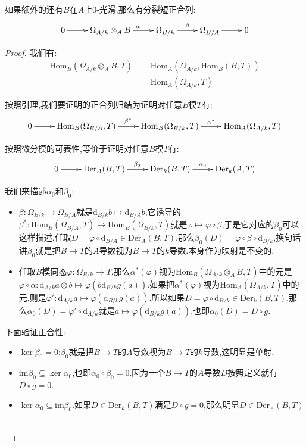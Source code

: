 \begin{enumerate}
	如果额外的还有$B$在$A$上0-光滑,那么有分裂短正合列:
	$$\xymatrix{0\ar[r]&\Omega_{A/k}\otimes_AB\ar[r]^{\alpha}&\Omega_{B/k}\ar[r]^{\beta}&\Omega_{B/A}\ar[r]&0}$$
	\begin{proof}
		
		我们有:
		\begin{align*}
			\mathrm{Hom}_B(\Omega_{A/k}\otimes_AB,T)&=\mathrm{Hom}_A(\Omega_{A/k},\mathrm{Hom}_B(B,T))\\&=\mathrm{Hom}_A(\Omega_{A/k},T)
		\end{align*}
		
		按照引理,我们要证明的正合列归结为证明对任意$B$模$T$有:
		$$\xymatrix{0\ar[r]&\mathrm{Hom}_B(\Omega_{B/A},T)\ar[r]^{\beta^*}&\mathrm{Hom}_B(\Omega_{B/k},T)\ar[r]^{\alpha^*}&\mathrm{Hom}_A(\Omega_{A/k},T)}$$
		
		按照微分模的可表性,等价于证明对任意$B$模$T$有:
		$$\xymatrix{0\ar[r]&\mathrm{Der}_A(B,T)\ar[r]^{\beta_0}&\mathrm{Der}_k(B,T)\ar[r]^{\alpha_0}&\mathrm{Der}_k(A,T)}$$
		
		我们来描述$\alpha_0$和$\beta_0$:
		\begin{itemize}
			\item $\beta:\Omega_{B/k}\to\Omega_{B/A}$就是$\mathrm{d}_{B/k}b\mapsto\mathrm{d}_{B/A}b$,它诱导的$\beta^*:\mathrm{Hom}_B(\Omega_{B/A},T)\to\mathrm{Hom}_B(\Omega_{B/k},T)$就是$\varphi\mapsto\varphi\circ\beta$,于是它对应的$\beta_0$可以这样描述,任取$D=\varphi\circ\mathrm{d}_{B/A}\in\mathrm{Der}_A(B,T)$,那么$\beta_0(D)=\varphi\circ\beta\circ\mathrm{d}_{B/k}$,换句话讲$\beta_0$就是把$B\to T$的$A$导数视为$B\to T$的$k$导数.本身作为映射是不变的.
			\item 任取$B$模同态$\varphi:\Omega_{B/k}\to T$,那么$\alpha^*(\varphi)$视为$\mathrm{Hom}_B(\Omega_{A/k}\otimes_AB,T)$中的元是$\varphi\circ\alpha:\mathrm{d}_{A/k}a\otimes b\mapsto\varphi(b\mathrm{d}_{B/k}g(a))$.如果把$\alpha^*(\varphi)$视为$\mathrm{Hom}_A(\Omega_{A/k},T)$中的元,则是$\varphi':\mathrm{d}_{A/k}a\mapsto\varphi(\mathrm{d}_{B/k}g(a))$.所以如果$D=\varphi\circ\mathrm{d}_{B/k}\in\mathrm{Der}_k(B,T)$,那么$\alpha_0(D)=\varphi'\circ\mathrm{d}_{A/k}$就是$a\mapsto\varphi(\mathrm{d}_{B/k}g(a))$,也即$\alpha_0(D)=D\circ g$.
		\end{itemize}
		
		下面验证正合性:
		\begin{itemize}
			\item $\ker\beta_0=0$:$\beta_0$就是把$B\to T$的$A$导数视为$B\to T$的$k$导数,这明显是单射.
			\item $\mathrm{im}\beta_0\subseteq\ker\alpha_0$,也即$\alpha_0\circ\beta_0=0$.因为一个$B\to T$的$A$导数$D$按照定义就有$D\circ g=0$.
			\item $\ker\alpha_0\subseteq\mathrm{im}\beta_0$.如果$D\in\mathrm{Der}_k(B,T)$满足$D\circ g=0$,那么明显$D\in\mathrm{Der}_A(B,T)$.
		\end{itemize}
		

\end{proof}
\end{enumerate}
